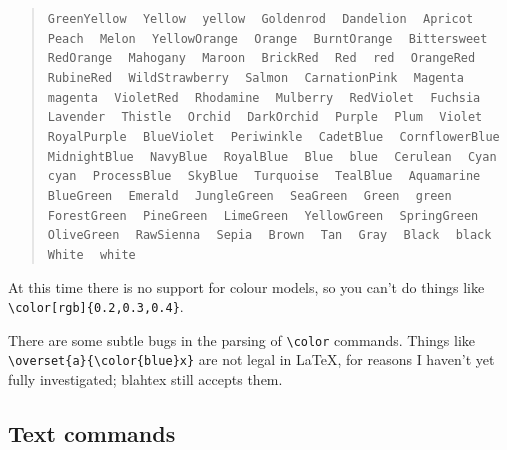 \documentclass{article}
\newcommand{\texcommand}[1]{\textbackslash{}#1}
\newcommand{\spacer}{\,\,\, \hfil}
\newcommand{\lastspacer}{\hfill\hfill\hfill}
\newenvironment{mylist}{\begin{quote}}{\end{quote}}
\begin{document}
\begin{mylist}
\texttt{GreenYellow} \spacer
\texttt{Yellow} \spacer
\texttt{yellow} \spacer
\texttt{Goldenrod} \spacer
\texttt{Dandelion} \spacer
\texttt{Apricot} \spacer
\texttt{Peach} \spacer
\texttt{Melon} \spacer
\texttt{YellowOrange} \spacer
\texttt{Orange} \spacer
\texttt{BurntOrange} \spacer
\texttt{Bittersweet} \spacer
\texttt{RedOrange} \spacer
\texttt{Mahogany} \spacer
\texttt{Maroon} \spacer
\texttt{BrickRed} \spacer
\texttt{Red} \spacer
\texttt{red} \spacer
\texttt{OrangeRed} \spacer
\texttt{RubineRed} \spacer
\texttt{WildStrawberry} \spacer
\texttt{Salmon} \spacer
\texttt{CarnationPink} \spacer
\texttt{Magenta} \spacer
\texttt{magenta} \spacer
\texttt{VioletRed} \spacer
\texttt{Rhodamine} \spacer
\texttt{Mulberry} \spacer
\texttt{RedViolet} \spacer
\texttt{Fuchsia} \spacer
\texttt{Lavender} \spacer
\texttt{Thistle} \spacer
\texttt{Orchid} \spacer
\texttt{DarkOrchid} \spacer
\texttt{Purple} \spacer
\texttt{Plum} \spacer
\texttt{Violet} \spacer
\texttt{RoyalPurple} \spacer
\texttt{BlueViolet} \spacer
\texttt{Periwinkle} \spacer
\texttt{CadetBlue} \spacer
\texttt{CornflowerBlue} \spacer
\texttt{MidnightBlue} \spacer
\texttt{NavyBlue} \spacer
\texttt{RoyalBlue} \spacer
\texttt{Blue} \spacer
\texttt{blue} \spacer
\texttt{Cerulean} \spacer
\texttt{Cyan} \spacer
\texttt{cyan} \spacer
\texttt{ProcessBlue} \spacer
\texttt{SkyBlue} \spacer
\texttt{Turquoise} \spacer
\texttt{TealBlue} \spacer
\texttt{Aquamarine} \spacer
\texttt{BlueGreen} \spacer
\texttt{Emerald} \spacer
\texttt{JungleGreen} \spacer
\texttt{SeaGreen} \spacer
\texttt{Green} \spacer
\texttt{green} \spacer
\texttt{ForestGreen} \spacer
\texttt{PineGreen} \spacer
\texttt{LimeGreen} \spacer
\texttt{YellowGreen} \spacer
\texttt{SpringGreen} \spacer
\texttt{OliveGreen} \spacer
\texttt{RawSienna} \spacer
\texttt{Sepia} \spacer
\texttt{Brown} \spacer
\texttt{Tan} \spacer
\texttt{Gray} \spacer
\texttt{Black} \spacer
\texttt{black} \spacer
\texttt{White} \spacer
\texttt{white} \lastspacer
\end{mylist}

At this time there is no support for colour models, so you can't do things like \texttt{\texcommand{color}[rgb]\{0.2,0.3,0.4\}}.

There are some subtle bugs in the parsing of \texttt{\texcommand{color}} commands. Things like \texttt{\texcommand{overset}\{a\}\{\texcommand{color}\{blue\}x\}} are not legal in \LaTeX, for reasons I haven't yet fully investigated; blahtex still accepts them.

\subsection{Text commands}
\end{document}
